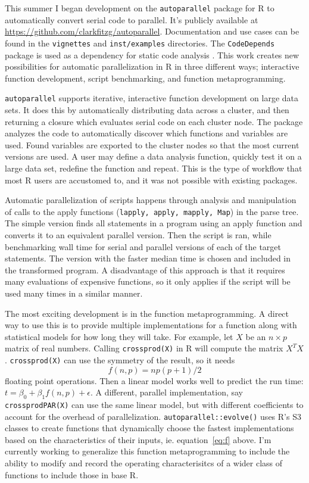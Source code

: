 \documentclass[12pt]{article}
\begin{document}
This summer I began development on the \texttt{autoparallel} package for R
to automatically convert serial code to parallel. It's publicly available
at \url{https://github.com/clarkfitzg/autoparallel}. Documentation and use
cases can be found in the \texttt{vignettes} and \texttt{inst/examples}
directories. The \texttt{CodeDepends} package is used as a dependency for
static code analysis \cite{R-CodeDepends}.
This work creates new possibilities for automatic parallelization in R in three
different ways; interactive function development, script benchmarking, and function
metaprogramming.

\texttt{autoparallel} supports iterative, interactive function development
on large data sets. It does this by automatically distributing data across
a cluster, and then returning a closure which evaluates serial code on each
cluster node. The package analyzes the code to automatically discover which
functions and variables are used. Found variables are exported to the
cluster nodes so that the most current versions are used.  A user may
define a data analysis function, quickly test it on a large data set,
redefine the function and repeat.  This is the type of workflow that most R
users are accustomed to, and it was not possible with existing packages.

Automatic parallelization of scripts happens through analysis and
manipulation of calls to the apply functions (\texttt{lapply, apply,
mapply, Map}) in the parse tree. The simple version finds all statements in
a program using an apply function and converts it to an equivalent parallel
version. Then the script is ran, while benchmarking wall time for serial
and parallel versions of each of the target statements. The version with
the faster median time is chosen and included in the transformed program.
A disadvantage of this approach is that it requires many evaluations of
expensive functions, so it only applies if the script will be used many
times in a similar manner.

The most exciting development is in the function metaprogramming.  A direct
way to use this is to provide multiple implementations for a function along
with statistical models for how long they will take. For example, let $X$
be an $n \times p$ matrix of real numbers. Calling \texttt{crossprod(X)} in
R will compute the matrix $X^T X$. \texttt{crossprod(X)} can use the
symmetry of the result, so it needs 
\[
    \label{eq:f}
    f(n, p) = n p (p + 1) / 2
\]
floating
point operations.  Then a linear model works well to predict the run time:
$t = \beta_0 + \beta_1 f(n, p) + \epsilon$. A different, parallel
implementation, say \texttt{crossprodPAR(X)} can use the same linear model,
but with different coefficients to account for the overhead of
parallelization. \texttt{autoparallel::evolve()} uses R's
S3 classes to create functions that dynamically choose the fastest
implementations based on the characteristics of their inputs, ie.
equation~\ref{eq:f} above. I'm currently working to generalize this
function metaprogramming to include the ability to modify and record the
operating characterisitcs of a wider class of functions to include those in
base R.
\end{document}
